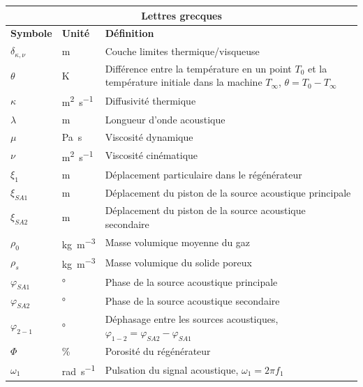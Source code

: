 \begin{center}
    \begin{longtable}{p{} @{} p{} @{} p{}}
        \multicolumn{3}{c}{Lettres grecques}  \\\hline
        \textbf{Symbole} & \textbf{Unité} & \textbf{Définition} \\\hline\hline
 		$\delta_{\kappa,\nu}$ & \unit{\meter} & Couche limites thermique/visqueuse \\
 		$\theta$ & \unit{\kelvin} & Différence entre la température en un point $T_0$ et la température initiale dans la machine $T_\infty$, ${\theta=T_0-T_\infty}$\\
 		$\kappa$ & \unit{\square\meter\per\second} & Diffusivité thermique \\	
 		$\lambda$ & \unit{\meter} & Longueur d'onde acoustique \\
        $\mu$ & \unit{\pascal\second} & Viscosité dynamique \\
        $\nu$ & \unit{\square\meter\per\second} & Viscosité cinématique \\
        $\xi_1$ & \unit{\meter} & Déplacement particulaire dans le régénérateur \\
        $\xi_{SA1}$ & \unit{\meter} & Déplacement du piston de la source acoustique principale \\
        $\xi_{SA2}$ & \unit{\meter} & Déplacement du piston de la source acoustique secondaire \\
        $\rho_0$ & \unit{\kilo\gram\per\cubic\meter} & Masse volumique moyenne du gaz \\
        $\rho_{s}$ & \unit{\kilo\gram\per\cubic\meter} & Masse volumique du solide poreux\\
        $\varphi_{SA1}$ & \unit{\degree} & Phase de la source acoustique principale \\
		$\varphi_{SA2}$ & \unit{\degree} & Phase de la source acoustique secondaire \\
        $\varphi_{2-1}$ & \unit{\degree} & Déphasage entre les sources acoustiques, $\varphi_{1-2} = \varphi_{SA2} - \varphi_{SA1}$\\
        $\Phi$ & \unit{\percent} & Porosité du régénérateur \\
        $\omega_1$ & \unit{\radian\per\second} & Pulsation du signal acoustique, $\omega_1=2\pi f_1$ \\\hline
    \end{longtable}


\end{center}
